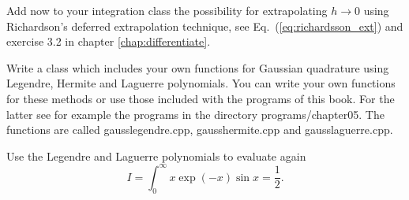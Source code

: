 \begin{prob}
Add now to your integration class the possibility for extrapolating $h\rightarrow 0$ using
Richardson's deferred extrapolation technique, see Eq.~(\ref{eq:richardsson_ext}) and exercise 
3.2 in chapter \ref{chap:differentiate}.
\end{prob}


\begin{prob}
Write a class which includes your own functions for Gaussian quadrature using
Legendre, Hermite and Laguerre polynomials. You can write your own functions for these methods or 
use those included with the programs of this book.
For the latter see for example the programs in the directory programs/chapter05. The functions are called gausslegendre.cpp, gausshermite.cpp and gausslaguerre.cpp.

Use the Legendre and Laguerre polynomials to evaluate again
\[
I= \int_0^{\infty} x\exp{(-x)}\sin{x}=\frac{1}{2}.
\]
\end{prob}


